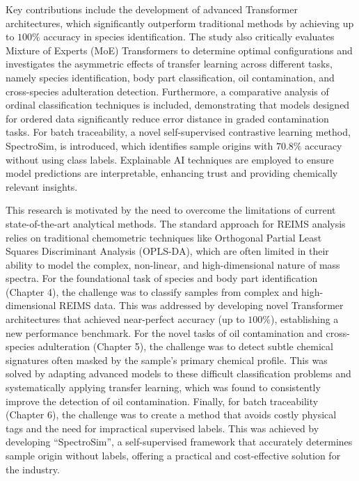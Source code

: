 \documentclass[11pt, a4paper, twoside, openright]{book}
\begin{document}
{Key contributions include the development of advanced Transformer architectures, which significantly outperform traditional methods by achieving up to $100\%$ accuracy in species identification. The study also critically evaluates Mixture of Experts (MoE) Transformers to determine optimal configurations and investigates the asymmetric effects of transfer learning across different tasks, namely species identification, body part classification, oil contamination, and cross-species adulteration detection. Furthermore, a comparative analysis of ordinal classification techniques is included, demonstrating that models designed for ordered data significantly reduce error distance in graded contamination tasks. For batch traceability, a novel self-supervised contrastive learning method, SpectroSim, is introduced, which identifies sample origins with $70.8\%$ accuracy without using class labels. Explainable AI techniques are employed to ensure model predictions are interpretable, enhancing trust and providing chemically relevant insights.

This research is motivated by the need to overcome the limitations of current state-of-the-art analytical methods. The standard approach for REIMS analysis relies on traditional chemometric techniques like Orthogonal Partial Least Squares Discriminant Analysis (OPLS-DA), which are often limited in their ability to model the complex, non-linear, and high-dimensional nature of mass spectra. For the foundational task of species and body part identification (Chapter 4), the challenge was to classify samples from complex and high-dimensional REIMS data. This was addressed by developing novel Transformer architectures that achieved near-perfect accuracy (up to $100\%$), establishing a new performance benchmark. For the novel tasks of oil contamination and cross-species adulteration (Chapter 5), the challenge was to detect subtle chemical signatures often masked by the sample’s primary chemical profile. This was solved by adapting advanced models to these difficult classification problems and systematically applying transfer learning, which was found to consistently improve the detection of oil contamination. Finally, for batch traceability (Chapter 6), the challenge was to create a method that avoids costly physical tags and the need for impractical supervised labels. This was achieved by developing ``SpectroSim'', a self-supervised framework that accurately determines sample origin without labels, offering a practical and cost-effective solution for the industry.
}
\phd
\end{document}
